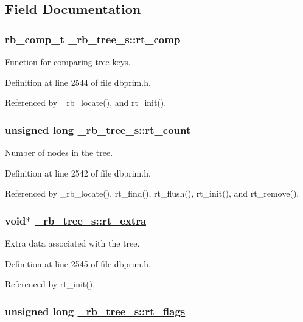 \subsection{Field Documentation}
\hypertarget{struct__rb__tree__s_o4}{
\subsubsection[rt\_\-comp]{\setlength{\rightskip}{0pt plus 5cm}\hyperlink{group__dbprim__rbtree_ga3}{rb\_\-comp\_\-t} \hyperlink{struct__rb__tree__s_o4}{\_\-rb\_\-tree\_\-s::rt\_\-comp}}}
\label{struct__rb__tree__s_o4}


Function for comparing tree keys. 

Definition at line 2544 of file dbprim.h.

Referenced by \_\-rb\_\-locate(), and rt\_\-init().\hypertarget{struct__rb__tree__s_o2}{
\subsubsection[rt\_\-count]{\setlength{\rightskip}{0pt plus 5cm}unsigned long \hyperlink{struct__rb__tree__s_o2}{\_\-rb\_\-tree\_\-s::rt\_\-count}}}
\label{struct__rb__tree__s_o2}


Number of nodes in the tree. 

Definition at line 2542 of file dbprim.h.

Referenced by \_\-rb\_\-locate(), rt\_\-find(), rt\_\-flush(), rt\_\-init(), and rt\_\-remove().\hypertarget{struct__rb__tree__s_o5}{
\subsubsection[rt\_\-extra]{\setlength{\rightskip}{0pt plus 5cm}void$\ast$ \hyperlink{struct__rb__tree__s_o5}{\_\-rb\_\-tree\_\-s::rt\_\-extra}}}
\label{struct__rb__tree__s_o5}


Extra data associated with the tree. 

Definition at line 2545 of file dbprim.h.

Referenced by rt\_\-init().\hypertarget{struct__rb__tree__s_o1}{
\subsubsection[rt\_\-flags]{\setlength{\rightskip}{0pt plus 5cm}unsigned long \hyperlink{struct__rb__tree__s_o1}{\_\-rb\_\-tree\_\-s::rt\_\-flags}}}
\label{struct__rb__tree__s_o1}


